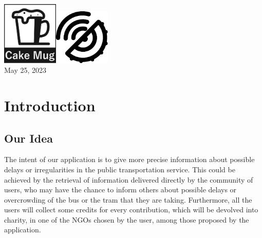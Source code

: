\documentclass[a4paper, 11pt]{report}
\begin{document}
\begin{titlepage}


	\vfill\vfill\vfill %


	\includegraphics[width=0.2\textwidth]{logo-bw.pdf}\qquad\includegraphics[width=0.2\textwidth]{logo-app.pdf}\\[1cm]%


	{\large May 25, 2023} %

	\vfill %

\end{titlepage}

\tableofcontents

\chapter{Introduction}
\section{Our Idea}\label{sec:our-idea}
The intent of our application is to give more precise information about possible delays or irregularities in the public transportation service. This could be achieved by the retrieval of information delivered directly by the community of users, who may have the chance to inform others about possible delays or overcrowding of the bus or the tram that they are taking.
Furthermore, all the users will collect some credits for every contribution, which will be devolved into charity, in one of the NGOs chosen by the user, among those proposed by the application.
\end{document}
